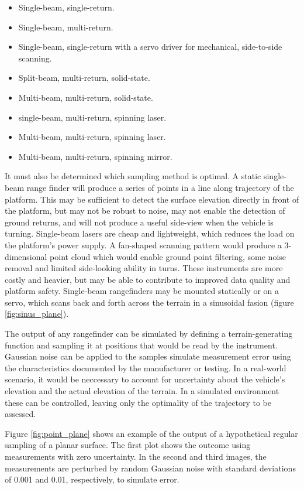 \documentclass[10pt,a4paper]{report}
\begin{document}
\begin{itemize}
\item Single-beam, single-return.
\item Single-beam, multi-return.
\item Single-beam, single-return with a servo driver for mechanical, side-to-side scanning.
\item Split-beam, multi-return, solid-state.
\item Multi-beam, multi-return, solid-state.
\item single-beam, multi-return, spinning laser.
\item Multi-beam, multi-return, spinning laser.
\item Multi-beam, multi-return, spinning mirror.
\label{list:rangefinder_configs}
\end{itemize}

It must also be determined which sampling method is optimal. A static single-beam range finder will produce a series of points in a line along trajectory of the platform. This may be sufficient to detect the surface elevation directly in front of the platform, but may not be robust to noise, may not enable the detection of ground returns, and will not produce a useful side-view when the vehicle is turning. Single-beam lasers are cheap and lightweight, which reduces the load on the platform's power supply. A fan-shaped scanning pattern would produce a 3-dimensional point cloud which would enable ground point filtering, some noise removal and limited side-looking ability in turns. These instruments are more costly and heavier, but may be able to contribute to improved data quality and platform safety. Single-beam rangefinders may be mounted statically or on a servo, which scans back and forth across the terrain in a sinusoidal fasion (figure \ref{fig:sinus_plane}).

The output of any rangefinder can be simulated by defining a terrain-generating function and sampling it at positions that would be read by the instrument. Gaussian noise can be applied to the samples simulate measurement error using the characteristics documented by the manufacturer or testing. In a real-world scenario, it would be neccessary to account for uncertainty about the vehicle's elevation and the actual elevation of the terrain. In a simulated environment these can be controlled, leaving only the optimality of the trajectory to be assessed.

Figure \ref{fig:point_plane} shows an example of the output of a hypothetical regular sampling of a planar surface. The first plot shows the outcome using measurements with zero uncertainty. In the second and third images, the measurements are perturbed by random Gaussian noise with standard deviations of 0.001 and 0.01, respectively, to simulate error.
\end{document}

